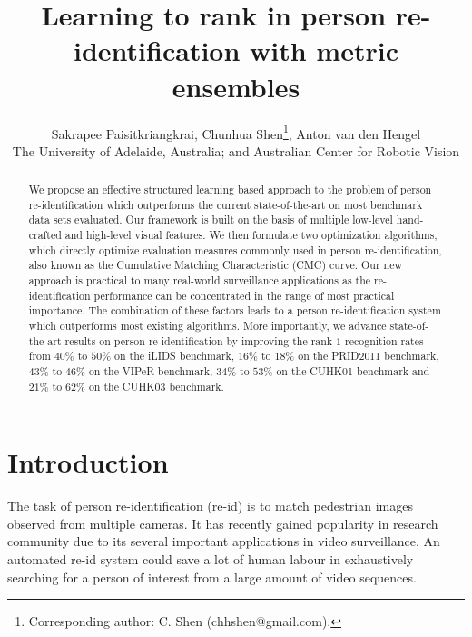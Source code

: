 \documentclass[10pt,twocolumn,letterpaper]{article}
\begin{document}
\title{Learning to rank in person re-identification with metric ensembles}


\author{
         Sakrapee Paisitkriangkrai,
         Chunhua Shen\thanks{Corresponding author: C. Shen (chhshen@gmail.com).},
         Anton van den Hengel
         \\
         The University of Adelaide, Australia; and Australian Center for Robotic Vision
}


\maketitle


\begin{abstract}



We propose an effective structured learning based approach
to the problem of person re-identification
which outperforms the current state-of-the-art on most benchmark data sets evaluated.
Our framework is built on the basis of multiple low-level hand-crafted
and high-level visual features.
We then formulate two optimization algorithms,
which directly optimize
evaluation measures commonly used in person re-identification, also known as
the Cumulative Matching Characteristic (CMC) curve.
Our new approach is practical to many real-world surveillance applications
as the re-identification performance can be concentrated in the range of most
practical importance.
The combination of these factors leads to a person re-identification system
which outperforms most existing algorithms.
More importantly, we advance state-of-the-art results on person re-identification
by improving the rank-$1$ recognition rates from $40\%$ to $50\%$ on the
iLIDS benchmark, $16\%$ to $18\%$ on the PRID2011 benchmark,
$43\%$ to $46\%$ on the VIPeR benchmark, $34\%$ to $53\%$ on the
CUHK01 benchmark and $21\%$ to $62\%$ on the CUHK03 benchmark.




\end{abstract}



\tableofcontents


\section{Introduction}

The task of person re-identification (re-id) is to match pedestrian images
observed from multiple cameras.
It has recently gained popularity in research community due to its
several important applications in video surveillance.
An automated re-id system could save a lot of human labour in
exhaustively searching for a person of interest from
a large amount of video sequences.
\end{document}
